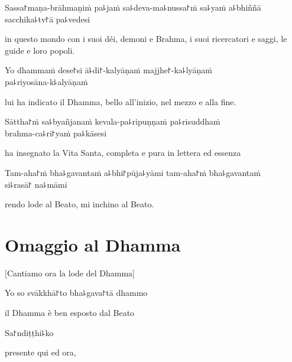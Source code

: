 Sassa꜓maṇa-brāhmaṇiṁ pa꜕jaṁ sa꜕deva-ma꜕nussa꜓ṁ sa꜕yaṁ a꜕bhiññā sacchika꜕tv꜓ā pa꜕vedesi

\begin{english}
in questo mondo con i suoi déi, demoni e Brahma, i suoi ricercatori e saggi, le guide e loro popoli.
\end{english}

Yo dhammaṁ dese꜓si ā꜕di꜓-kalyāṇaṁ majjhe꜓-ka꜕lyāṇaṁ \\pa꜕riyosāna-k꜕alyāṇaṁ

\begin{english}
lui ha indicato il Dhamma, bello all'inizio, nel mezzo e alla fine.
\end{english}

Sāttha꜓ṁ sa꜕byañjanaṁ kevala-pa꜕ripuṇṇaṁ pa꜕risuddhaṁ \\brahma-ca꜕ri꜓yaṁ pa꜕kāsesi

\begin{english}
ha insegnato la Vita Santa, completa e pura in lettera ed essenza
\end{english}

Tam-aha꜓ṁ bha꜕gavantaṁ a꜕bhi꜓pūja꜕yāmi tam-aha꜓ṁ bha꜕gavantaṁ \\si꜕rasā꜓ na꜕māmi

\begin{english}
rendo lode al Beato, mi inchino al Beato. 
\end{english}

\clearpage

\chapter{Omaggio al Dhamma}

\begin{leader}
\end{leader}

\begin{english}
[Cantiamo ora la lode del Dhamma]
\end{english}

Yo so svākkhā꜓to bha꜕gava꜓tā dhammo

\begin{english}
il Dhamma è ben esposto dal Beato
\end{english}

Sa꜓ndiṭṭhi꜕ko

\begin{english}
presente qui ed ora, 
\end{english}

